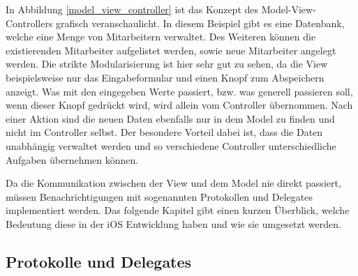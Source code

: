 \documentclass[11pt,a4paper]{report}
\begin{document}
In Abbildung \ref{model_view_controller} ist das Konzept des Model-View-Controllers grafisch veranschaulicht. In diesem Beispiel gibt es eine Datenbank, welche eine Menge von Mitarbeitern verwaltet. Des Weiteren können die existierenden Mitarbeiter aufgelistet werden, sowie neue Mitarbeiter angelegt werden. Die strikte Modularisierung ist hier sehr gut zu sehen, da die View beispielsweise nur das Eingabeformular und einen Knopf zum Abspeichern anzeigt. Was mit den eingegeben Werte passiert, bzw. was generell passieren soll, wenn dieser Knopf gedrückt wird, wird allein vom Controller übernommen. Nach einer Aktion sind die neuen Daten ebenfalls nur in dem Model zu finden und nicht im Controller selbst. Der besondere Vorteil dabei ist, dass die Daten unabhängig verwaltet werden und so verschiedene Controller unterschiedliche Aufgaben übernehmen können. \cite{harris2014beginning}

Da die Kommunikation zwischen der View und dem Model nie direkt passiert, müssen Benachrichtigungen mit sogenannten Protokollen und Delegates implementiert werden. Das folgende Kapitel gibt einen kurzen Überblick, welche Bedeutung diese in der iOS Entwicklung haben und wie sie umgesetzt werden.

\subsection{Protokolle und Delegates}
\end{document}
